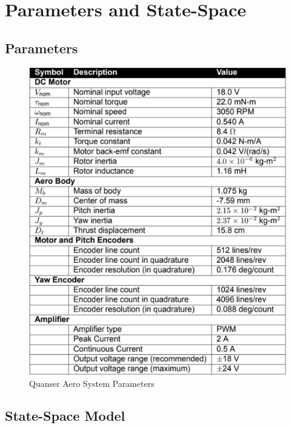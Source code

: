 \chapter{Parameters and State-Space}

\section{Parameters}

\begin{figure}[!htbp]
 \begin{center}
  \includegraphics[scale=.75]{figs/img/quanserAeroSystemParameters}
 \end{center}
\caption{Quanser Aero System Parameters}
\label{fig.systemParameters}
\end{figure}



\section{State-Space Model}




